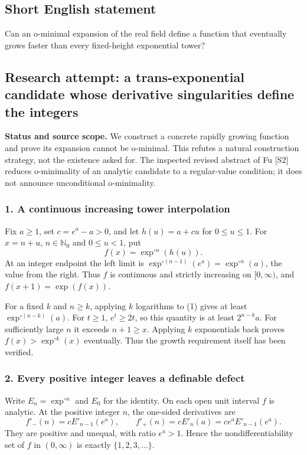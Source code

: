 \documentclass[11pt,a4paper]{article}
\begin{document}
\subsection{Short English statement}

Can an o-minimal expansion of the real field define a function that eventually grows faster than every fixed-height exponential tower?

\subsection{Research attempt: a trans-exponential candidate whose derivative singularities define the integers}
\textbf{Status and source scope.} We construct a concrete rapidly growing function and prove its expansion cannot be o-minimal. This refutes a natural construction strategy, not the existence asked for. The inspected revised abstract of Fu [S2] reduces o-minimality of an analytic candidate to a regular-value condition; it does not announce unconditional o-minimality.

\subsubsection{1. A continuous increasing tower interpolation}
Fix $a\geq1$, set $c=e^a-a>0$, and let $h(u)=a+cu$ for $0\leq u\leq1$. For $x=n+u$, $n\in\mathbb N_0$ and $0\leq u<1$, put
\[f(x)=\exp^{\circ n}(h(u)).\tag{1}\]
At an integer endpoint the left limit is $\exp^{\circ(n-1)}(e^a)=\exp^{\circ n}(a)$, the value from the right. Thus $f$ is continuous and strictly increasing on $[0,\infty)$, and $f(x+1)=\exp(f(x))$.

For a fixed $k$ and $n\geq k$, applying $k$ logarithms to (1) gives at least $\exp^{\circ(n-k)}(a)$. For $t\geq1$, $e^t\geq2t$, so this quantity is at least $2^{n-k}a$. For sufficiently large $n$ it exceeds $n+1\geq x$. Applying $k$ exponentials back proves $f(x)>\exp^{\circ k}(x)$ eventually. Thus the growth requirement itself has been verified.

\subsubsection{2. Every positive integer leaves a definable defect}
Write $E_n=\exp^{\circ n}$ and $E_0$ for the identity. On each open unit interval $f$ is analytic. At the positive integer $n$, the one-sided derivatives are
\[f'_-(n)=cE'_{n-1}(e^a),\qquad
f'_+(n)=cE'_n(a)=ce^a E'_{n-1}(e^a).
\]
They are positive and unequal, with ratio $e^a>1$. Hence the nondifferentiability set of $f$ in $(0,\infty)$ is exactly $\{1,2,3,\ldots\}$.
\end{document}
